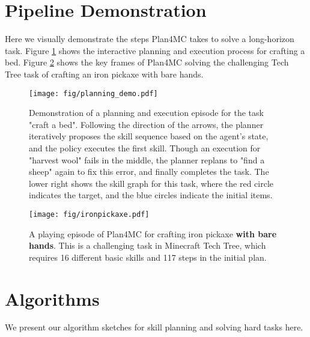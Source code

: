 \documentclass{article}
\begin{document}
\newpage
\section{Pipeline Demonstration}

Here we visually demonstrate the steps Plan4MC takes to solve a long-horizon task. Figure \ref{fig:execute-pipeline} shows the interactive planning and execution process for crafting a bed. Figure \ref{fig:ironpickaxe} shows the key frames of Plan4MC solving the challenging Tech Tree task of crafting an iron pickaxe with bare hands.

\begin{figure}[htbp]
  \centering
  \texttt{[image: fig/planning\_demo.pdf]}
  \vspace{-4mm}
  \caption{Demonstration of a planning and execution episode for the task "craft a bed". Following the direction of the arrows, the planner iteratively proposes the skill sequence based on the agent's state, and the policy executes the first skill. Though an execution for "harvest wool" fails in the middle, the planner replans to "find a sheep" again to fix this error, and finally completes the task. The lower right shows the skill graph for this task, where the red circle indicates the target, and the blue circles indicate the initial items.}
  \label{fig:execute-pipeline}
\end{figure}

\vspace{2mm}

\begin{figure}[htbp]
  \centering
  \texttt{[image: fig/ironpickaxe.pdf]}
  \caption{A playing episode of Plan4MC for crafting iron pickaxe \textbf{with bare hands}. This is a challenging task in Minecraft Tech Tree, which requires 16 different basic skills and 117 steps in the initial plan.}
  \label{fig:ironpickaxe}
\end{figure}

\newpage
\section{Algorithms}
\label{appendix:algorithms}

We present our algorithm sketches for skill planning and solving hard tasks here.
\end{document}
